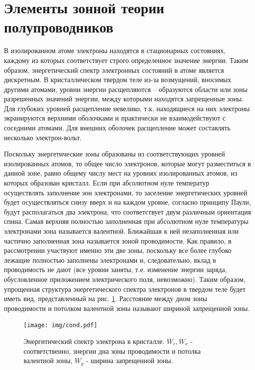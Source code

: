 \documentclass[a4paper,14pt]{extarticle}
\begin{document}
\section{Элементы зонной теории полупроводников}
В изолированном атоме электроны находятся в стационарных состояниях, каждому из которых соответствует строго
определенное значение энергии. Таким образом, энергетический спектр электронных состояний в атоме является дискретным. В
кристаллическом твердом теле из-за возмущений, вносимых другими атомами, уровни энергии расщепляются – образуются
области или зоны разрешенных значений энергии, между которыми находятся запрещенные зоны. Для глубоких уровней
расщепление невелико, т.к. находящиеся на них электроны экранируются верхними оболочками и практически не
взаимодействуют с соседними атомами. Для внешних оболочек расщепление может составлять несколько электрон-вольт. 

Поскольку энергетические зоны образованы из соответствующих уровней изолированных атомов, то общее число электронов,
которые могут разместиться в данной зоне, равно общему числу мест на уровнях изолированных атомов, из которых образован
кристалл. Если при абсолютном нуле температур осуществлять заполнение зон электронами, то заселение энергетических
уровней будет осуществляться снизу вверх и на каждом уровне, согласно принципу Паули, будут располагаться два электрона,
что соответствует двум различным ориентация спина. Самая верхняя полностью заполненная при абсолютном нуле температуры
электронами зона называется валентной. Ближайшая к ней незаполненная или частично заполненная зона называется зоной
проводимости. Как правило, в рассмотрении участвуют именно эти две зоны, поскольку все более глубоко лежащие полностью
заполнены электронами и, следовательно, вклад в проводимость не дают (все уровни заняты, т.е. изменение энергии заряда,
обусловленное приложением электрического поля, невозможно). Таким образом, упрощенная структура энергетического спектра
электронов в твердом теле будет иметь вид, представленный на рис. \ref{fig:cond}. Расстояние между дном зоны проводимости и
потолком валентной зоны называют шириной запрещенной зоны. 

\begin{figure}
	\texttt{[image: img/cond.pdf]}
	\caption{Энергитический спектр электрона в кристалле. $W_c,W_{\nu}$ - соответственно, энергии дна зоны проводимости и потолка валентной зоны, $W_g$ - ширина запрещенной зоны.}
	\label{fig:cond}
\end{figure}
\end{document}

